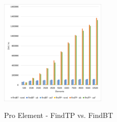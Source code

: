 \begin{figure}[hbt]
    \centering
    \includegraphics[width=0.45\textwidth]{img/excel/splay_tp_vs_bt.png}\label{fig:splay-bt-vs-tp}
    \caption{Pro Element - FindTP vs. FindBT}
    \label{fig:AVL-insert}
\end{figure}

